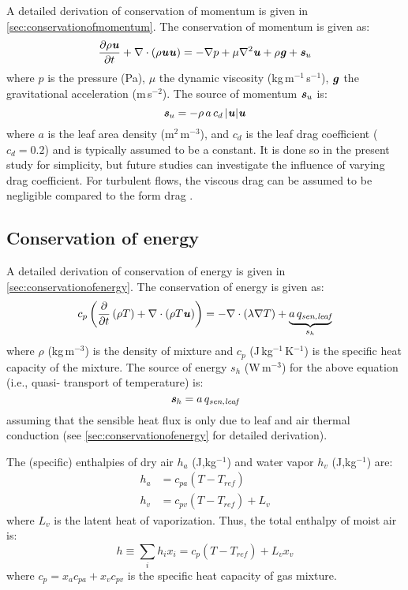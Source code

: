 A detailed derivation of conservation of momentum is given in \cref{sec:conservationofmomentum}. The conservation of momentum is given as:
\begin{equation}
\frac{\partial \rho \textbf{\textit{u}}}{\partial t} + \nabla  \cdot \left( \rho \textbf{\textit{u}} \textbf{\textit{u}} \right) = -\nabla p + \mu \nabla^2 \textbf{\textit{u}} + \rho \textbf{\textit{g}} + \textbf{\textit{s}}_u
\end{equation}
where $p$ is the pressure (Pa), $\mu$ the dynamic viscosity (kg\,m$^{-1}$\,s$^{-1}$), $\textbf{\textit{g}}$ the gravitational acceleration (m\,s$^{-2}$). The source of momentum $\textbf{\textit{s}}_u$ is:
\begin{equation}
\textbf{\textit{s}}_u = - \rho\, a \,c_d \,|\textbf{\textit{u}}|\textbf{\textit{u}}
\label{eq:suu}
\end{equation}
where $a$ is the leaf area density (m$^2$\,m$^{-3}$), and $c_d$ is the leaf drag coefficient ($c_d = 0.2$) \citep{Wilson1977} and is typically assumed to be a constant. It is done so in the present study for simplicity, but future studies can investigate the influence of varying drag coefficient. For turbulent flows, the viscous drag can be assumed to be negligible compared to the form drag \citep{Judd1996, Li1990, Liu1996}. 

\subsection*{Conservation of energy}

A detailed derivation of conservation of energy is given in \cref{sec:conservationofenergy}. The conservation of energy is given as:
\begin{equation}
c_p  \left( \frac{\partial }{\partial t} \left( \rho T \right) + \nabla \cdot \left(\rho T \textbf{\textit{u}} \right)  \right) = - \nabla  \cdot \left(\lambda \nabla T \right) + \underbrace{a\,q_{\textit{sen,leaf}}}_{s_h}
\end{equation}
where $\rho$ (kg\,m$^{-3}$) is the density of mixture and $c_p$ (J\,kg$^{-1}$\,K$^{-1}$) is the specific heat capacity of the mixture. The source of energy $s_h$ (W\,m$^{-3}$) for the above equation (i.e., quasi- transport of temperature) is:
\begin{equation}
\textbf{\textit{s}}_h = a\, q_{\textit{sen,leaf}}
\label{eq:sh}
\end{equation}
assuming that the sensible heat flux is only due to leaf and air thermal conduction (see \cref{sec:conservationofenergy} for detailed derivation). 

The (specific) enthalpies of dry air $h_a$ (J,kg$^{-1}$) and water vapor $h_v$ (J,kg$^{-1}$) are:
\begin{align}
h_a &= c_{pa} \left(T - T_{\mathit{ref}}\right) \\
h_v &= c_{pv} \left(T - T_{\mathit{ref}}\right) + L_v
\end{align}
where $L_v$ is the latent heat of vaporization. Thus, the total enthalpy of moist air is:
\begin{equation}
h \equiv \sum_i h_i x_i = c_p \left(T - T_{\mathit{ref}}\right) + L_v x_v
\end{equation}
where $c_p = x_a c_{\textit{pa}} +  x_v c_{\textit{pv}}$ is the specific heat capacity of gas mixture.

